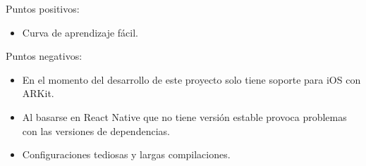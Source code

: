\begin{itemize}
    Puntos positivos:
    \begin{itemize}
        \item Curva de aprendizaje fácil.
    \end{itemize}
    Puntos negativos:
    \begin{itemize}
        \item En el momento del desarrollo de este proyecto solo tiene soporte
        para iOS con ARKit.
        \item Al basarse en React Native que no tiene versión estable
        provoca problemas con las versiones de dependencias.
        \item Configuraciones tediosas y largas compilaciones.
    \end{itemize}
\end{itemize}


